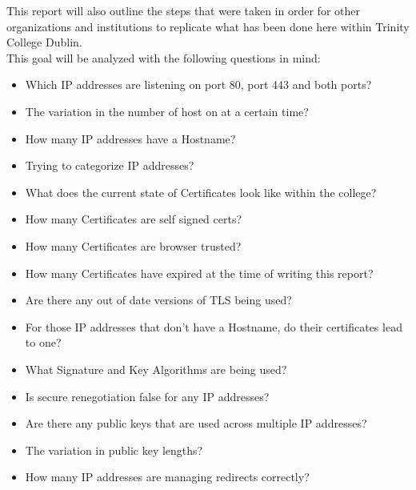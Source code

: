 \documentclass[a4wide,leqno,12pt]{report}
\begin{document}
This report  will also outline the steps that were taken in order for other organizations and institutions to replicate what has been done here within Trinity College Dublin.\\


This goal will be analyzed with the following questions in mind:
\begin{itemize}
  \item Which IP addresses are listening on port 80, port 443 and both ports?
  \item The variation in the number of host on at a certain time?
  \item How many IP addresses have a Hostname?
  \item Trying to categorize IP addresses?
  \item What does the current state of Certificates look like within the college?
  \item How many Certificates are self signed certs?
  \item How many Certificates are browser trusted?
   \item How many Certificates have expired at the time of writing this report?
  \item Are there any out of date versions of TLS being used?
  \item For those IP addresses that don't have a Hostname, do their certificates lead to one?
  \item What Signature and Key Algorithms are being used?
  \item Is secure renegotiation false for any IP addresses?
  \item Are there any public keys that are used across multiple IP addresses?
  \item The variation in public key lengths?
  \item How many IP addresses are managing redirects correctly?
 
\end{itemize}
\end{document}

